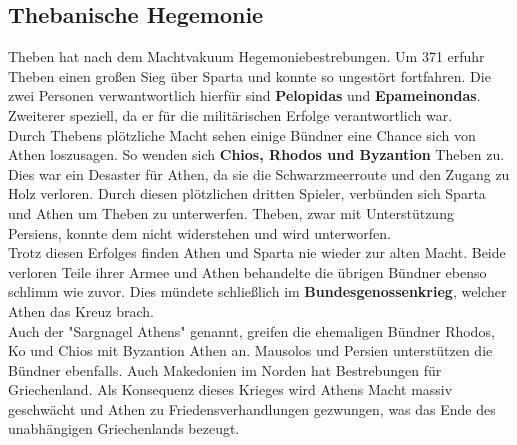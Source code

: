 \documentclass{article}
\begin{document}
	\subsection{Thebanische Hegemonie}
	Theben hat nach dem Machtvakuum Hegemoniebestrebungen. Um 371 erfuhr Theben einen großen Sieg über Sparta und konnte so ungestört fortfahren. Die zwei Personen verwantwortlich hierfür sind \textbf{Pelopidas} und \textbf{Epameinondas}. Zweiterer speziell, da er für die militärischen Erfolge verantwortlich war. \\
	Durch Thebens plötzliche Macht sehen einige Bündner eine Chance sich von Athen loszusagen. So wenden sich \textbf{Chios, Rhodos und Byzantion} Theben zu. Dies war ein Desaster für Athen, da sie die Schwarzmeerroute und den Zugang zu Holz verloren. Durch diesen plötzlichen dritten Spieler, verbünden sich Sparta und Athen um Theben zu unterwerfen. Theben, zwar mit Unterstützung Persiens, konnte dem nicht widerstehen und wird unterworfen. \\
	Trotz diesen Erfolges finden Athen und Sparta nie wieder zur alten Macht. Beide verloren Teile ihrer Armee und Athen behandelte die übrigen Bündner ebenso schlimm wie zuvor. Dies mündete schließlich im \textbf{Bundesgenossenkrieg}, welcher Athen das Kreuz brach. \\
	Auch der "Sargnagel Athens" genannt, greifen die ehemaligen Bündner Rhodos, Ko und Chios mit Byzantion Athen an. Mausolos und Persien unterstützen die Bündner ebenfalls. Auch Makedonien im Norden hat Bestrebungen für Griechenland. Als Konsequenz dieses Krieges wird Athens Macht massiv geschwächt und Athen zu Friedensverhandlungen gezwungen, was das Ende des unabhängigen Griechenlands bezeugt. \\
\end{document}
